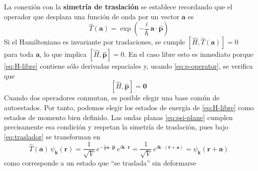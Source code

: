 \documentclass{article}
\begin{document}
La conexión con la \textcolor{Cerulean}{\textbf{simetría de traslación}} se establece recordando que el operador que desplaza una función de onda por un vector $\mathbf a$ es
\begin{equation}\label{eq:traslador}
\hat T(\mathbf a)=\exp\!\left(-\frac{i}{\hbar}\,\mathbf a\cdot\hat{\mathbf p}\right)
\end{equation}
Si el Hamiltoniano es invariante por traslaciones, se cumple $[\hat H,\hat T(\mathbf a)]=0$ para toda $\mathbf a$, lo que implica $[\hat H,\hat{\mathbf p}]=0$. En el caso libre esto es inmediato porque \eqref{eq:H-libre} contiene sólo derivadas espaciales y, usando \eqref{eq:p-operator}, se verifica que
\begin{equation}\label{eq:conmutador}
[\hat H,\hat{\mathbf p}]=\mathbf 0
\end{equation}
Cuando dos operadores conmutan, es posible elegir una base común de autoestados. Por tanto, podemos elegir los estados de energía de \eqref{eq:H-libre} como estados de momento bien definido. Las ondas planas \eqref{eq:psi-plane} cumplen precisamente esa condición y respetan la simetría de traslación, pues bajo \eqref{eq:traslador} se transforman en
\begin{equation}\label{eq:traslada-psi}
\hat T(\mathbf a)\,\psi_{\mathbf k}(\mathbf r)
=\frac{1}{\sqrt V}\,e^{-\frac{i}{\hbar}\mathbf a\cdot\hat{\mathbf p}}\,e^{i\mathbf k\cdot\mathbf r}
=\frac{1}{\sqrt V}\,e^{i\mathbf k\cdot(\mathbf r+\mathbf a)}
=\psi_{\mathbf k}(\mathbf r+\mathbf a)
\end{equation}
como corresponde a un estado que “se traslada” sin deformarse
\end{document}
